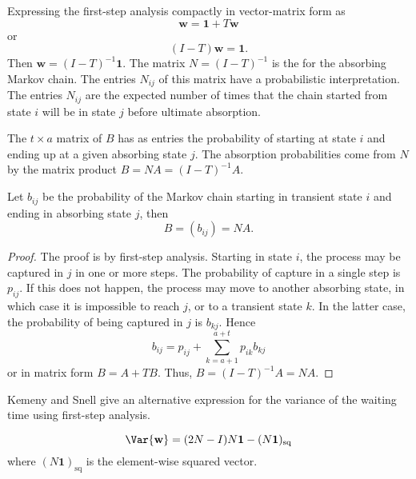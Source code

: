 \documentclass[12pt]{article}
\begin{document}
Expressing the first-step analysis compactly in vector-matrix form as
\[
    \mathbf{w} = \mathbf{1} + T \mathbf{w}
\] or
\[
    (I - T) \mathbf{w} = \mathbf{1}.
\] Then \( \mathbf{w} = (I-T)^{-1} \mathbf{1} \).  The matrix \( N = (I-T)^
{-1} \) is the %
for the absorbing Markov chain.  The entries \( N_{ij} \) of this matrix
have a probabilistic interpretation.  The entries \( N_{ij} \) are the
expected number of times that the chain started from state \( i \) will
be in state \( j \) before ultimate absorption.

The \( t \times a \) matrix of %
\( B \) has as entries the probability of starting at state \( i \) and ending up
at a given absorbing state \( j \).  The absorption probabilities come
from \( N \) by the matrix product \( B = NA = (I-T)^{-1}A \).  

\begin{theorem}
  Let \( b_{ij} \) be the probability of the Markov chain starting
  in transient state \( i \) and ending in absorbing state $j$, then
  \[
        B = ( b_{ij} ) = NA.
  \]
\end{theorem}

\begin{proof}
   The proof is by first-step analysis.  Starting in state \( i \),
   the process may be captured in \( j \) in one or more steps.  The
   probability of capture in a single step is \( p_{ij} \).  If this
   does not happen, the process may move to another absorbing state,
   in which case it is impossible to reach \( j \), or to a transient
   state \( k \).  In the latter case, the probability of being
   captured in \( j \) is \( b_{kj} \).  Hence
   \[
        b_{ij} = p_{ij} + \sum\limits_{k =a+1}^{a+t} p_{ik} b_{kj}
   \]
   or in matrix form \( B = A + TB\). Thus, \( B = (I-T)^{-1} A = NA \). 
\end{proof}

Kemeny and Snell \cite[page 51]{kemeny60} give an alternative expression for the variance of
the waiting time using first-step analysis.

\begin{theorem} \label{thm:waitingtimeabsorbtion''varwaittime}
\[
     \Var{\mathbf{w}} = (2N - I)N\mathbf{1} -
     (N\mathbf{1})_{\text{sq}}
\]
where \( (N\mathbf{1})_{\text{sq}} \) is the element-wise squared vector.
\end{theorem}
\end{document}
